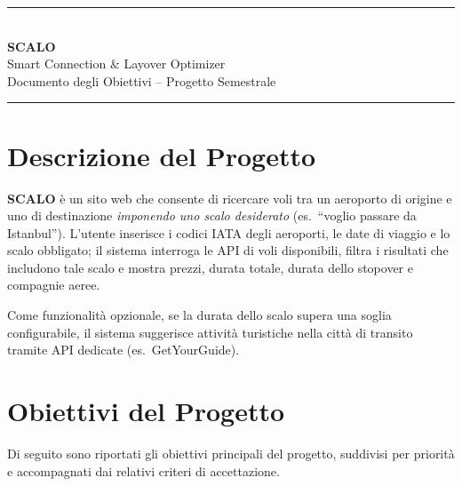 \documentclass[a4paper, 11pt]{article}
\begin{document}
\begin{center}
  {\color{black}\rule{\textwidth}{2pt}}\\[10pt]
  {\fontsize{22}{26}\selectfont\bfseries\color{black}SCALO}\\[4pt]
  {\large\color{black}Smart Connection \& Layover Optimizer}\\[6pt]
  {\normalsize\color{muted}Documento degli Obiettivi -- Progetto Semestrale}\\[10pt]
  {\color{black}\rule{\textwidth}{2pt}}
\end{center}

\vspace{8pt}

\vspace{6pt}

\section{Descrizione del Progetto}

\textbf{SCALO} \`e un sito web che consente di ricercare voli tra un aeroporto di origine e uno di destinazione \emph{imponendo uno scalo desiderato} (es.\ ``voglio passare da Istanbul''). L'utente inserisce i codici IATA degli aeroporti, le date di viaggio e lo scalo obbligato; il sistema interroga le API di voli disponibili, filtra i risultati che includono tale scalo e mostra prezzi, durata totale, durata dello stopover e compagnie aeree.

Come funzionalit\`a opzionale, se la durata dello scalo supera una soglia configurabile, il sistema suggerisce attivit\`a turistiche nella citt\`a di transito tramite API dedicate (es.\ GetYourGuide).

\section{Obiettivi del Progetto}

Di seguito sono riportati gli obiettivi principali del progetto, suddivisi per priorit\`a e accompagnati dai relativi criteri di accettazione.
\end{document}
